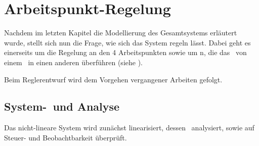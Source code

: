 \chapter{Arbeitspunkt-Regelung}\label{cha:apr}

Nachdem im letzten Kapitel die Modellierung des Gesamtsystems erläutert wurde, stellt sich nun die Frage, wie sich das System regeln lässt. Dabei geht es einerseits um die Regelung an den 4 Arbeitspunkten  sowie um \traj n, die das \dpd\ von einem \ap\ in einen anderen überführen (siehe ).

Beim Reglerentwurf wird dem Vorgehen vergangener Arbeiten gefolgt. 


\section{System-\lin\ und Analyse}%

Das nicht-lineare System wird zunächst linearisiert, dessen \ewe\ analysiert, sowie auf Steuer- und Beobachtbarkeit überprüft.

\subsection{\lin}\label{sec:lin}


